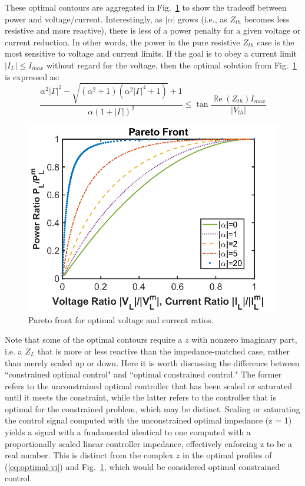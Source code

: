 \documentclass{ifacconf}
\renewcommand{\Re}{\operatorname{\mathbb{R}e}}
\begin{document}
These optimal contours are aggregated in Fig.~\ref{fig:pareto} to show the tradeoff between power and voltage/current. Interestingly, as $|\alpha|$ grows (i.e., as $Z_{th}$ becomes less resistive and more reactive), there is less of a power penalty for a given voltage or current reduction. In other words, the power in the pure resistive $Z_{th}$ case is the most sensitive to voltage and current limits. If the goal is to obey a current limit $|I_L| \leq I_{max}$ without regard for the voltage, then the optimal solution from Fig.~\ref{fig:pareto} is expressed as:
\begin{equation}
   \frac{\alpha^2 |\Gamma|^2 - \sqrt{(\alpha^2 + 1)(\alpha^2 |\Gamma|^4 + 1)} + 1}{\alpha (1 + |\Gamma|)^2} \leq \tan \frac{\Re(Z_{th}) I_{max}}{|V_{th}|}
\end{equation}
\begin{figure}
    \centering
    \includegraphics[width=\linewidth]{ifacconf_latex/figs/pareto2.png}
    \caption{Pareto front for optimal voltage and current ratios.}
    \label{fig:pareto}
\end{figure}
Note that some of the optimal contours require a $z$ with nonzero imaginary part, i.e. a $Z_L$ that is more or less reactive than the impedance-matched case, rather than merely scaled up or down. Here it is worth discussing the difference between ``constrained optimal control" and ``optimal constrained control." The former refers to the unconstrained optimal controller that has been scaled or saturated until it meets the constraint, while the latter refers to the controller that is optimal for the constrained problem, which may be distinct. Scaling or saturating the control signal computed with the unconstrained optimal impedance (z = 1) yields a signal with a fundamental identical to one computed with a proportionally scaled linear controller impedance, effectively enforcing z to be a real number. This is distinct from the complex $z$ in the optimal profiles of (\ref{eq:optimal-vi}) and Fig.~\ref{fig:pareto}, which would be considered optimal constrained control. 
\end{document}
